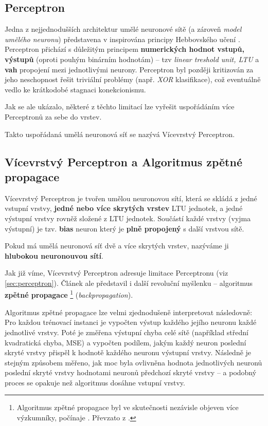 \subsection{Perceptron}
\label{sec:perceptron}
Jedna z nejjednodušších architektur umělé neuronové sítě (a zároveň \emph{model umělého neuronu}) představena v \cite{Rosenblatt1957} inspirována principy Hebbovského učení \cite{Hebb1949}.
Perceptron přichází s důležitým principem \textbf{numerických hodnot vstupů, výstupů} (oproti pouhým binárním hodnotám) – tzv \emph{linear treshold unit, LTU} a \textbf{vah} propojení mezi jednotlivými neurony. 
Perceptron byl později kritizován \cite{Minsky1969} za jeho neschopnost řešit triviální problémy (např. \emph{XOR} klasifikace), což eventuálně vedlo ke krátkodobé stagnaci konekcionismu.

Jak se ale ukázalo, některé z těchto limitací lze vyřešit uspořádáním více Perceptronů za sebe do vrstev. \cite{Rumelhart1987}

Takto uspořádaná umělá neuronová síť se nazývá Vícevrstvý Perceptron.

\subsection{Vícevrstvý Perceptron a Algoritmus zpětné propagace}
\label{sec:multilayer_perceptron}
Vícevrstvý Perceptron je tvořen umělou neuronovou sítí, která se skládá z jedné vstupní vrstvy, \textbf{jedné nebo více skrytých vrstev} LTU jednotek, a jedné výstupní vrstvy rovněž složené z LTU jednotek.
Součástí každé vrstvy (vyjma výstupní) je tzv. \textbf{bias} neuron který je \textbf{plně propojený} s další vrstvou sítě. \cite{Geron2019}

Pokud má umělá neuronová síť dvě a více skrytých vrstev, nazýváme ji \textbf{hlubokou neuronouvou sítí}.

Jak již víme, Vícevrstvý Perceptron adresuje limitace Perceptronu (viz \autoref{sec:perceptron}).
Článek \cite{Rumelhart1987} ale představil i další revoluční myšlenku – algoritmus \textbf{zpětné propagace}
\footnote{Algoritmus zpětné propagace byl ve skutečnosti nezávisle objeven více výzkumníky, počínaje \cite{Werbos1974}. Převzato z \cite{Geron2019}.} (\emph{backpropagation}).

Algoritmus zpětné propagace lze velmi zjednodušeně interpretovat následovně: Pro každou trénovací instanci je vypočten výstup každého jejího neuronu každé jednotlivé vrstvy.
Poté je změřena výstupní chyba celé sítě (například střední kvadratická chyba, MSE) a vypočten podílem, jakým každý neuron poslední skryté vrstvy přispěl k hodnotě každého neuronu výstupní vrstvy.
Následně je stejným způsobem měřeno, jak moc byla ovlivněna hodnota jednotlivých neuronů poslední skryté vrstvy hodnotami neuronů předchozí skryté vrstvy – a podobný proces se opakuje než algoritmus dosáhne vstupní vrstvy. \cite{Geron2019}

